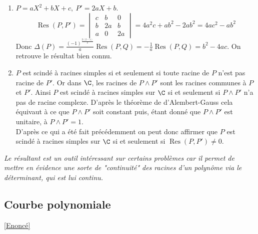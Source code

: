\documentclass{book}
\begin{document}
\begin{enumerate}
		Ainsi, $P\land Q=1\iff\det\varphi\ne 0\iff \det\operatorname{Mat}_{B,B_c}(\varphi)=\operatorname{Res}(P,Q)\ne 0$.
		\item $P=aX^2+bX+c,\ P'=2aX+b$.
		$$\operatorname{Res}(P,P')=
		\begin{vmatrix}
			c&b&0\\
			b&2a&b\\
			a&0&2a
		\end{vmatrix}
		=4a^2c+ab^2-2ab^2=4ac^2-ab^2$$
		Donc $\Delta(P)=\displaystyle\frac{(-1)^{\frac{2(2-1)}{2}}}{a}\operatorname{Res}(P,Q)=-\displaystyle\frac{1}{a}\operatorname{Res}(P,Q)=b^2-4ac$. On retrouve le résultat bien connu.
		\item $P$ est scindé à racines simples si et seulement si toute racine de $P$ n'est pas racine de $P'$. Or dans $\C$, les racines de $P\land P'$ sont les racines communes à $P$ et $P'$. Ainsi $P$ est scindé à racines simples sur $\C$ si et seulement si $P\land P'$ n'a pas de racine complexe. D'après le théorème de d'Alembert-Gauss cela équivaut à ce que $P\land P'$ soit constant puis, étant donné que $P\land P'$ est unitaire, à $P\land P'=1$.\\
		D'après ce qui a été fait précédemment on peut donc affirmer que $P$ est scindé à racines simples sur $\C$ si et seulement si $\operatorname{Res}(P,P')\ne 0$.
	\end{enumerate}
	\textit{Le résultant est un outil intéressant sur certains problèmes car il permet de mettre en évidence une sorte de "continuité" des racines d'un polynôme via le déterminant, qui est lui continu.}
	
	\subsection{Courbe polynomiale}
	\label{Courbe polynomiale corrigé}
	\textcolor{blue}{\hyperref[Courbe polynomiale]{[Enoncé]}}\\
	
\end{document}
